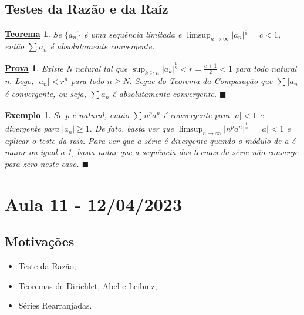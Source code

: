 \documentclass{article}
\newtheorem*{theorem*}{\underline{Teorema}}
\newtheorem{example}{\underline{Exemplo}}
\newtheorem*{proof*}{\underline{Prova}}
\renewcommand\qedsymbol{$\blacksquare$}
\begin{document}
\subsection{Testes da Raz\~ao e da Ra\'iz}
 \begin{theorem*}
   Se $\{a_{n}\}$ \'e uma sequ\^encia limitada e $\limsup_{n\to\infty}|a_{n}|^{\frac{1}{n}} = c < 1$, ent\~ao $\sum\limits_{}^{}a_{n}$
  \'e absolutamente convergente.
 \end{theorem*}
\begin{proof*}
  Existe N natural tal que $\sup_{k\geq{n}}|a_{k}|^{\frac{1}{k}} < r = \frac{c+1}{2} < 1$ para todo natural n. Logo, $|a_{n}|<r^{n}$ para
todo $n\geq{N}.$ Segue do Teorema da Compara\c c\~ao que $\sum\limits_{}^{}|a_{n}|$ \'e convergente, ou seja, $\sum\limits_{}^{}a_{n}$ \'e absolutamente convergente. \qedsymbol
\end{proof*}
\begin{example}
  Se p \'e natural, ent\~ao $\sum\limits_{}^{}n^{p}a^{n}$ \'e convergente para $|a|< 1$ e divergente para $|a_{n}| \geq{1}.$ De fato,
basta ver que $\limsup_{n\to\infty}|n^{p}a^{n}|^{\frac{1}{n}} = |a| < 1$ e aplicar o teste da ra\'iz. Para ver que a s\'erie \'e divergente 
quando o m\'odulo de a \'e maior ou igual a 1, basta notar que a sequ\^encia dos termos da s\'erie n\~ao converge para zero neste caso. \qedsymbol
\end{example}
\newpage

\section{Aula 11 - 12/04/2023}
\subsection{Motiva\c c\~oes}
\begin{itemize}
  \item Teste da Raz\~ao;
  \item Teoremas de Dirichlet, Abel e Leibniz;
  \item S\'eries Rearranjadas.
\end{itemize}
\end{document}
